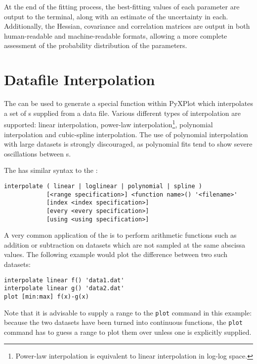 At the end of the fitting process, the best-fitting values of each parameter
are output to the terminal, along with an estimate of the uncertainty in each.
Additionally, the Hessian, covariance and correlation matrices are output in
both human-readable and machine-readable formats, allowing a more complete
assessment of the probability distribution of the parameters.

\section{Datafile Interpolation}
\label{sec:spline_command}

The  can be used to generate a special function within
PyXPlot which interpolates a set of \datapoint s supplied from a data file.
Various different types of interpolation are supported: linear interpolation,
power-law interpolation\footnote{Power-law interpolation is equivalent to
linear interpolation in log-log space.}, polynomial interpolation and
cubic-spline interpolation. The use of polynomial interpolation with large
datasets is strongly discouraged, as polynomial fits tend to show severe
oscillations between \datapoint s.

The  has similar syntax to the :

\begin{verbatim}
interpolate ( linear | loglinear | polynomial | spline )
            [<range specification>] <function name>() '<filename>' 
            [index <index specification>]
            [every <every specification>]
            [using <using specification>]
\end{verbatim}

A very common application of the  is to perform arithmetic
functions such as addition or subtraction on datasets which are not sampled at
the same abscissa values. The following example would plot the difference
between two such datasets:

\begin{verbatim}
interpolate linear f() 'data1.dat'
interpolate linear g() 'data2.dat'
plot [min:max] f(x)-g(x)
\end{verbatim}

\noindent Note that it is advisable to supply a range to the {\tt plot} command
in this example: because the two datasets have been turned into continuous
functions, the {\tt plot} command has to guess a range to plot them over unless
one is explicitly supplied.

